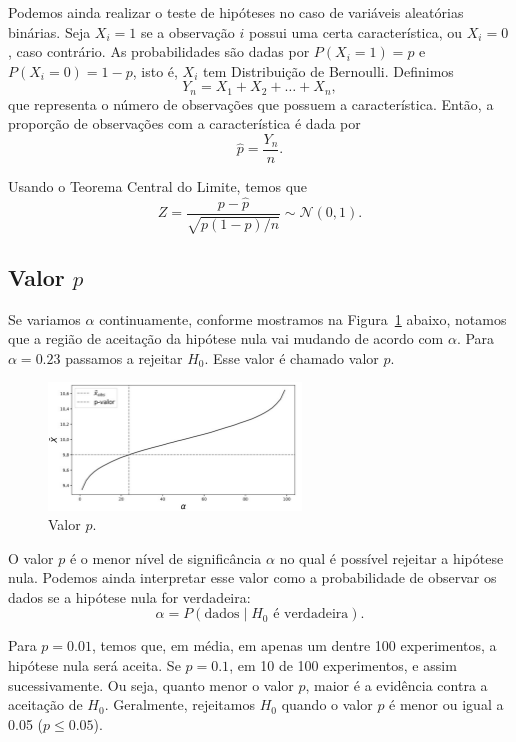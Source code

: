 \documentclass{article}
\begin{document}
Podemos ainda realizar o teste de hipóteses no caso de variáveis aleatórias binárias. Seja $X_i = 1$ se a observação $i$ possui uma certa característica, ou $X_i = 0$, caso contrário. As probabilidades são dadas por $P(X_i = 1) = p$ e $P(X_i = 0) = 1-p$, isto é, $X_i$ tem Distribuição de Bernoulli. Definimos 
    $$
    Y_n = X_1 + X_2 + \ldots + X_n,
    $$
que representa o número de observações que possuem a característica. Então, a proporção de observações com a característica é dada por
    $$
    \hat{p} = \frac{Y_n}{n}.
    $$

Usando o Teorema Central do Limite, temos que
    $$
    Z = \frac{p - \hat{p}}{\sqrt{p(1-p)/n}} \sim \mathcal{N}(0, 1).
    $$

\subsection{Valor $p$}
Se variamos $\alpha$ continuamente, conforme mostramos na Figura~\ref{fig:valor_p} abaixo, notamos que a região de aceitação da hipótese nula vai mudando de acordo com $\alpha$. Para $\alpha = 0.23$ passamos a rejeitar $H_0$. Esse valor é chamado valor $p$.

\begin{figure}[H]
    \centering
    \includegraphics[width=0.6\textwidth]{figuras/valor_p.png}
    \caption{Valor $p$.}
    \label{fig:valor_p}
\end{figure}

O valor $p$ é o menor nível de significância $\alpha$ no qual é possível rejeitar a hipótese nula. Podemos ainda interpretar esse valor como a probabilidade de observar os dados se a hipótese nula for verdadeira:
    $$
    \alpha = P(\text{dados} \mid H_0 \text{ é verdadeira}).
    $$

Para $p = 0.01$, temos que, em média, em apenas um dentre 100 experimentos, a hipótese nula será aceita. Se $p = 0.1$, em 10 de 100 experimentos, e assim sucessivamente. Ou seja, quanto menor o valor $p$, maior é a evidência contra a aceitação de $H_0$. Geralmente, rejeitamos $H_0$ quando o valor $p$ é menor ou igual a 0.05 ($p \leq 0.05$).
\end{document}
